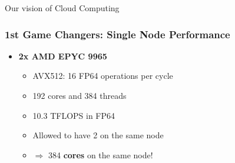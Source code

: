\documentclass[10pt,aspectratio=1609]{beamer}
\begin{document}
\begin{section}{Our vision of Cloud Computing}




\begin{frame}
  \frametitle{1st Game Changers: Single Node Performance}


  \begin{itemize}
    \item \textbf{2x AMD EPYC 9965}
    \begin{itemize}
      \item AVX512: 16 FP64 operations per cycle
      \item 192 cores and 384 threads
      \item 10.3 TFLOPS in FP64
      \item Allowed to have 2 on the same node
      \item $\Rightarrow$ 384 \textbf{cores} on the same node!
    \end{itemize}


\end{itemize}
\end{frame}
\end{section}
\end{document}
